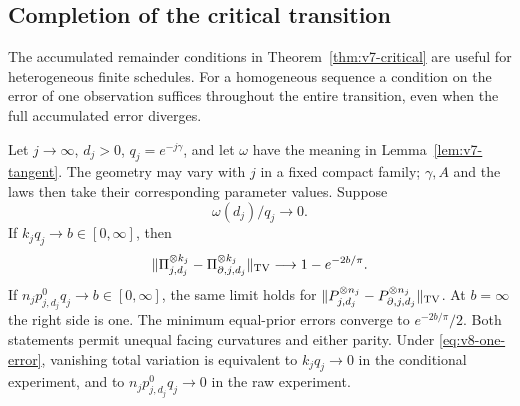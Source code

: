 \subsection{Completion of the critical transition}
The accumulated remainder conditions in Theorem~\ref{thm:v7-critical}
are useful for heterogeneous finite schedules. For a homogeneous
sequence a condition on the error of one observation suffices throughout
the entire transition, even when the full accumulated error diverges.

\begin{theorem}
\label{thm:v8-supercritical}
Let $j\to\infty$, $d_j>0$, $q_j=e^{-j\gamma}$, and let $\omega$ have
the meaning in Lemma~\ref{lem:v7-tangent}. The geometry may vary with
$j$ in a fixed compact family; $\gamma,A$ and the laws then take
their corresponding parameter values. Suppose
\begin{equation}\label{eq:v8-one-error}
                     \omega(d_j)/q_j\longrightarrow0.
\end{equation}
If $k_jq_j\to b\in[0,\infty]$, then
\[
 \|\Pi_{j,d_j}^{\otimes k_j}-
       \Pi_{\partial,j,d_j}^{\otimes k_j}\|_{\rm TV}
                               \longrightarrow1-e^{-2b/\pi}.
\]
If $n_jp_{j,d_j}^0q_j\to b\in[0,\infty]$, the same limit holds for
$\|P_{j,d_j}^{\otimes n_j}-P_{\partial,j,d_j}^{\otimes n_j}\|_{\rm TV}$.
At $b=\infty$ the right side is one. The minimum equal-prior errors
converge to $e^{-2b/\pi}/2$. Both statements permit unequal facing
curvatures and either parity. Under \eqref{eq:v8-one-error}, vanishing
total variation is equivalent to $k_jq_j\to0$ in the conditional
experiment, and to $n_jp_{j,d_j}^0q_j\to0$ in the raw experiment.
\end{theorem}
